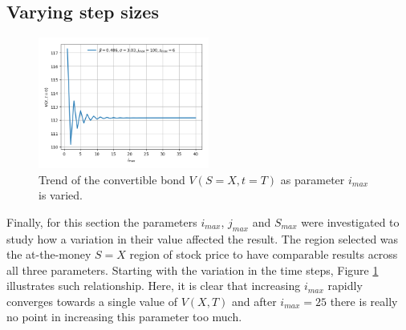 \documentclass{article}
\begin{document}
\subsection{Varying step sizes}
\begin{figure}[!h]
\includegraphics[width=0.5\textwidth,center]{../images/european_varying_imax.png}
\caption{Trend of the convertible bond $V(S=X,t=T)$ as parameter $i_{max}$ is varied.}
\label{fig:varying_imax}
\end{figure}
Finally, for this section the parameters $i_{max}$, $j_{max}$ and $S_{max}$ were investigated to study how a variation in their value affected the result.
The region selected was the at-the-money $S=X$ region of stock price to have comparable results across all three parameters.
Starting with the variation in the time steps, Figure \ref{fig:varying_imax} illustrates such relationship.
Here, it is clear that increasing $i_{max}$ rapidly converges towards a single value of $V(X,T)$ and after $i_{max}=25$ there is really no point in increasing this parameter too much.
\end{document}
